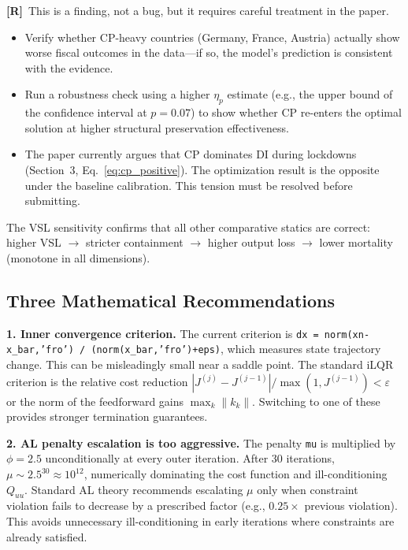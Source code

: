 \documentclass[12pt, a4paper]{article}
\newcommand{\recommend}[1]{\textcolor{recommend}{\textbf{[R]}~#1}}
\begin{document}
\recommend{This is a finding, not a bug, but it requires careful treatment in the paper.}
\begin{itemize}
    \item Verify whether CP-heavy countries (Germany, France, Austria) actually show
        worse fiscal outcomes in the data---if so, the model's prediction is consistent
        with the evidence.
    \item Run a robustness check using a higher $\eta_p$ estimate (e.g., the upper bound
        of the confidence interval at $p = 0.07$) to show whether CP re-enters the
        optimal solution at higher structural preservation effectiveness.
    \item The paper currently argues that CP dominates DI during lockdowns (Section~3,
        Eq.~\ref{eq:cp_positive}). The optimization result is the opposite under the
        baseline calibration. This tension must be resolved before submitting.
\end{itemize}

The VSL sensitivity confirms that all other comparative statics are correct: higher
VSL $\to$ stricter containment $\to$ higher output loss $\to$ lower mortality (monotone
in all dimensions).

\subsection{Three Mathematical Recommendations}

\textbf{1. Inner convergence criterion.} The current criterion is
\texttt{dx = norm(xn-x\_bar,'fro') / (norm(x\_bar,'fro')+eps)}, which measures state
trajectory change. This can be misleadingly small near a saddle point. The standard
iLQR criterion is the relative cost reduction $|J^{(j)} - J^{(j-1)}| / \max(1, J^{(j-1)}) < \varepsilon$
or the norm of the feedforward gains $\max_k \|k_k\|$. Switching to one of these provides
stronger termination guarantees.

\textbf{2. AL penalty escalation is too aggressive.}
The penalty \texttt{mu} is multiplied by $\phi = 2.5$ unconditionally at every outer
iteration. After 30 iterations, $\mu \sim 2.5^{30} \approx 10^{12}$, numerically
dominating the cost function and ill-conditioning $Q_{uu}$. Standard AL theory
\citep{nocedal2006} recommends escalating $\mu$ only when constraint violation fails
to decrease by a prescribed factor (e.g., $0.25\times$ previous violation). This
avoids unnecessary ill-conditioning in early iterations where constraints are already
satisfied.
\end{document}
